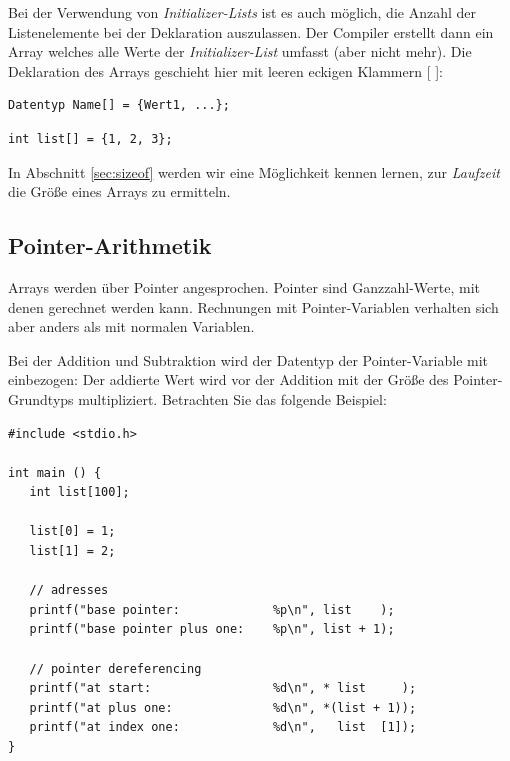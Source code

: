 Bei der Verwendung von \emph{Initializer-Lists} ist es auch möglich, die Anzahl der Listenelemente bei der Deklaration auszulassen. Der Compiler erstellt dann ein Array welches alle Werte der \emph{Initializer-List} umfasst (aber nicht mehr). Die Deklaration des Arrays geschieht hier mit leeren eckigen Klammern [ ]:

\begin{codebox}
\begin{verbatim}
Datentyp Name[] = {Wert1, ...};
\end{verbatim}
\end{codebox}

\begin{codebox}
\begin{verbatim}
int list[] = {1, 2, 3};
\end{verbatim}
\end{codebox}

In Abschnitt \ref{sec:sizeof} werden wir eine Möglichkeit kennen lernen, zur \emph{Laufzeit} die Größe eines Arrays zu ermitteln.

\subsection{Pointer-Arithmetik}
Arrays werden über Pointer angesprochen. Pointer sind Ganzzahl-Werte, mit denen gerechnet werden kann. Rechnungen mit Pointer-Variablen verhalten sich aber anders als mit normalen Variablen.

Bei der Addition und Subtraktion wird der Datentyp der Pointer-Variable mit einbezogen: Der addierte Wert wird vor der Addition mit der Größe des Pointer-Grundtyps multipliziert. Betrachten Sie das folgende Beispiel:

\begin{codebox}
\begin{verbatim}
#include <stdio.h>

int main () {
   int list[100];

   list[0] = 1;
   list[1] = 2;

   // adresses
   printf("base pointer:             %p\n", list    );
   printf("base pointer plus one:    %p\n", list + 1);

   // pointer dereferencing
   printf("at start:                 %d\n", * list     );
   printf("at plus one:              %d\n", *(list + 1));
   printf("at index one:             %d\n",   list  [1]);
}
\end{verbatim}
\end{codebox}


